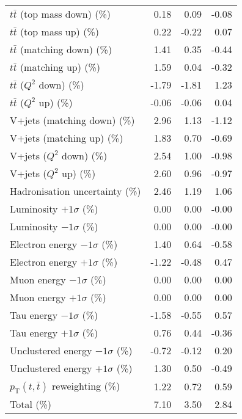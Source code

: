 \begin{table}[htbp]
{\begin{tabular}{lrrr}
$t\bar{t}$ (top mass down) (\%) & 0.18 & 0.09 & -0.08 \\ 
$t\bar{t}$ (top mass up) (\%) & 0.22 & -0.22 & 0.07 \\ 
$t\bar{t}$ (matching down) (\%) & 1.41 & 0.35 & -0.44 \\ 
$t\bar{t}$ (matching up) (\%) & 1.59 & 0.04 & -0.32 \\ 
$t\bar{t}$ ($Q^{2}$ down) (\%) & -1.79 & -1.81 & 1.23 \\ 
$t\bar{t}$ ($Q^{2}$ up) (\%) & -0.06 & -0.06 & 0.04 \\ 
V+jets (matching down) (\%) & 2.96 & 1.13 & -1.12 \\ 
V+jets (matching up) (\%) & 1.83 & 0.70 & -0.69 \\ 
V+jets ($Q^{2}$ down) (\%) & 2.54 & 1.00 & -0.98 \\ 
V+jets ($Q^{2}$ up) (\%) & 2.60 & 0.96 & -0.97 \\ 
Hadronisation uncertainty (\%) & 2.46 & 1.19 & 1.06 \\ 
Luminosity $+1\sigma$ (\%) & 0.00 & 0.00 & -0.00 \\ 
Luminosity $-1\sigma$ (\%) & 0.00 & 0.00 & -0.00 \\ 
Electron energy $-1\sigma$ (\%) & 1.40 & 0.64 & -0.58 \\ 
Electron energy $+1\sigma$ (\%) & -1.22 & -0.48 & 0.47 \\ 
Muon energy $-1\sigma$ (\%) & 0.00 & 0.00 & 0.00 \\ 
Muon energy $+1\sigma$ (\%) & 0.00 & 0.00 & 0.00 \\ 
Tau energy $-1\sigma$ (\%) & -1.58 & -0.55 & 0.57 \\ 
Tau energy $+1\sigma$ (\%) & 0.76 & 0.44 & -0.36 \\ 
Unclustered energy $-1\sigma$ (\%) & -0.72 & -0.12 & 0.20 \\ 
Unclustered energy $+1\sigma$ (\%) & 1.30 & 0.50 & -0.49 \\ 
$p_\mathrm{T}(t,\bar{t})$ reweighting (\%) & 1.22 & 0.72 & 0.59 \\ 
\hline 
Total (\%) & 7.10  & 3.50  & 2.84 \\ 
\hline 
\end{tabular}
}
\end{table}
